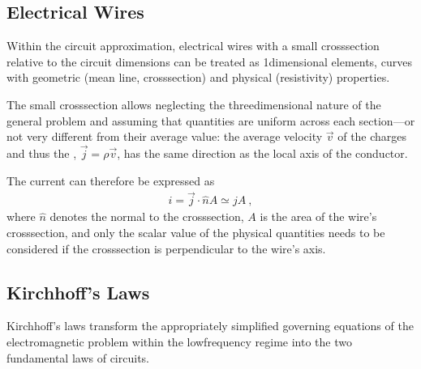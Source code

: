 \documentclass[letterpaper,10pt,english]{jupyterBook}
\begin{document}
\subsection{Electrical Wires}
\label{\detokenize{ch/circuits-electric-components:electrical-wires}}\label{\detokenize{ch/circuits-electric-components:physics-hs-electromagnetism-circuits-electric-electric-cable}}
\sphinxAtStartPar
Within the circuit approximation, electrical wires with a small cross\sphinxhyphen{}section relative to the circuit dimensions can be treated as 1\sphinxhyphen{}dimensional elements, curves with geometric (mean line, cross\sphinxhyphen{}section) and physical (resistivity) properties.

\sphinxAtStartPar
The small cross\sphinxhyphen{}section allows neglecting the three\sphinxhyphen{}dimensional nature of the general problem and assuming that quantities are uniform across each section—or not very different from their average value: the average  velocity \(\vec{v}\) of the charges and thus the , \(\vec{j} = \rho \vec{v}\), has the same direction as the local axis of the conductor.

\sphinxAtStartPar
The current can therefore be expressed as
\begin{equation}\label{equation:ch/circuits-electric-components:eq:cable:current-current-density}
\begin{split}i = \vec{j} \cdot \hat{n} A \simeq j A \ ,\end{split}
\end{equation}
\sphinxAtStartPar
where \(\hat{n}\) denotes the normal to the cross\sphinxhyphen{}section, \(A\) is the area of the wire’s cross\sphinxhyphen{}section, and only the scalar value of the physical quantities needs to be considered if the cross\sphinxhyphen{}section is perpendicular to the wire’s axis.

\sphinxAtStartPar
{} 


\subsection{Kirchhoff’s Laws}
\label{\detokenize{ch/circuits-electric-components:kirchhoff-s-laws}}\label{\detokenize{ch/circuits-electric-components:physics-hs-electromagnetism-circuits-electric-kirchhoff-laws}}
\sphinxAtStartPar
Kirchhoff’s laws transform the appropriately simplified governing equations of the electromagnetic problem within the low\sphinxhyphen{}frequency regime into the two fundamental laws of circuits.
\end{document}

